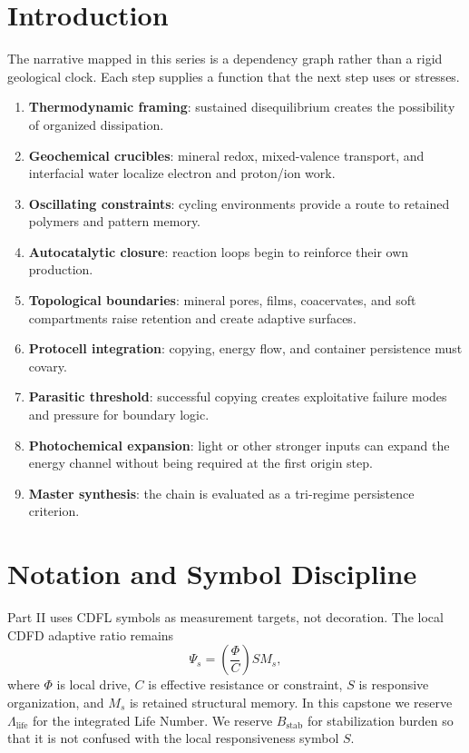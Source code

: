 \documentclass[11pt,a4paper]{article}
\begin{document}
\section{Introduction}
The narrative mapped in this series is a dependency graph rather than a rigid geological clock. Each step supplies a function that the next step uses or stresses.
\begin{enumerate}
 \item \textbf{Thermodynamic framing}: sustained disequilibrium creates the possibility of organized dissipation.
 \item \textbf{Geochemical crucibles}: mineral redox, mixed-valence transport, and interfacial water localize electron and proton/ion work.
 \item \textbf{Oscillating constraints}: cycling environments provide a route to retained polymers and pattern memory.
 \item \textbf{Autocatalytic closure}: reaction loops begin to reinforce their own production.
 \item \textbf{Topological boundaries}: mineral pores, films, coacervates, and soft compartments raise retention and create adaptive surfaces.
 \item \textbf{Protocell integration}: copying, energy flow, and container persistence must covary.
 \item \textbf{Parasitic threshold}: successful copying creates exploitative failure modes and pressure for boundary logic.
 \item \textbf{Photochemical expansion}: light or other stronger inputs can expand the energy channel without being required at the first origin step.
 \item \textbf{Master synthesis}: the chain is evaluated as a tri-regime persistence criterion.
\end{enumerate}

\section{Notation and Symbol Discipline}
Part II uses CDFL symbols as measurement targets, not decoration. The local CDFD adaptive ratio remains
\begin{equation}
 \Psi_s=\left(\frac{\Phi}{C}\right)SM_s,
\end{equation}
where $\Phi$ is local drive, $C$ is effective resistance or constraint, $S$ is responsive organization, and $M_s$ is retained structural memory. In this capstone we reserve $\Lambda_{\mathrm{life}}$ for the integrated Life Number. We reserve $B_{\mathrm{stab}}$ for stabilization burden so that it is not confused with the local responsiveness symbol $S$.
\end{document}
